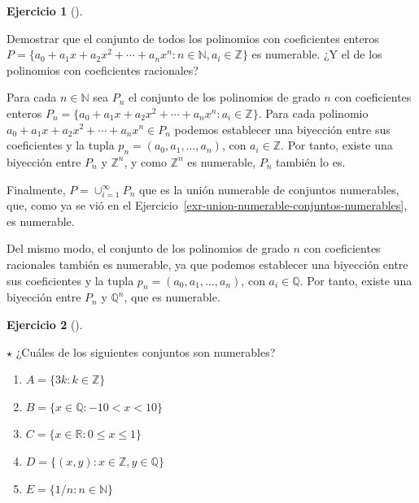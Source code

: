 \documentclass[
  spanish,
  a4paper,
]{scrreport}
\providecommand{\tightlist}{%
  \setlength{\itemsep}{0pt}\setlength{\parskip}{0pt}}
\theoremstyle{definition}
\newtheorem{exercise}{Ejercicio}[chapter]
\theoremstyle{remark}
\begin{document}
\begin{exercise}[]\protect\hypertarget{exr-conjunto-polinomios-no-numerable}{}\label{exr-conjunto-polinomios-no-numerable}

Demostrar que el conjunto de todos los polinomios con coeficientes
enteros
\(P=\{a_0+a_1x+a_2x^2+\cdots+a_nx^n: n\in \mathbb{N}, a_i\in \mathbb{Z}\}\)
es numerable. ¿Y el de los polinomios con coeficientes racionales?

\end{exercise}

\begin{tcolorbox}[enhanced jigsaw, arc=.35mm, bottomrule=.15mm, bottomtitle=1mm, breakable, colback=white, colbacktitle=quarto-callout-tip-color!10!white, colframe=quarto-callout-tip-color-frame, coltitle=black, left=2mm, leftrule=.75mm, opacityback=0, opacitybacktitle=0.6, rightrule=.15mm, title=\textcolor{quarto-callout-tip-color}{\faLightbulb}\hspace{0.5em}{Solución}, titlerule=0mm, toprule=.15mm, toptitle=1mm]

Para cada \(n\in\mathbb{N}\) sea \(P_n\) el conjunto de los polinomios
de grado \(n\) con coeficientes enteros
\(P_n=\{a_0+a_1x+a_2x^2+\cdots+a_nx^n: a_i\in \mathbb{Z}\}\). Para cada
polinomio \(a_0+a_1x+a_2x^2+\cdots+a_nx^n\in P_n\) podemos establecer
una biyección entre sus coeficientes y la tupla
\(p_n=(a_0,a_1,\ldots,a_n)\), con \(a_i\in\mathbb{Z}\). Por tanto,
existe una biyección entre \(P_n\) y \(\mathbb{Z}^n\), y como
\(\mathbb{Z}^n\) es numerable, \(P_n\) también lo es.

Finalmente, \(P=\cup_{i=1}^\infty P_n\) que es la unión numerable de
conjuntos numerables, que, como ya se vió en el
Ejercicio~\ref{exr-union-numerable-conjuntos-numerables}, es numerable.

Del mismo modo, el conjunto de los polinomios de grado \(n\) con
coeficientes racionales también es numerable, ya que podemos establecer
una biyección entre sus coeficientes y la tupla
\(p_n=(a_0,a_1,\ldots,a_n)\), con \(a_i\in\mathbb{Q}\). Por tanto,
existe una biyección entre \(P_n\) y \(\mathbb{Q}^n\), que es numerable.

\end{tcolorbox}

\begin{exercise}[]\protect\hypertarget{exr-conjuntos-numerables}{}\label{exr-conjuntos-numerables}

\(\star\) ¿Cuáles de los siguientes conjuntos son numerables?

\begin{enumerate}
\def\labelenumi{\alph{enumi}.}
\tightlist
\item
  \(A = \{3k: k\in \mathbb{Z}\}\)
\item
  \(B = \{x\in \mathbb{Q}: -10 < x < 10\}\)
\item
  \(C = \{x\in \mathbb{R}: 0\leq x\leq 1\}\)
\item
  \(D = \{(x,y): x\in \mathbb{Z}, y\in \mathbb{Q}\}\)
\item
  \(E = \{1/n : n\in \mathbb{N}\}\)
\end{enumerate}

\end{exercise}
\end{document}
